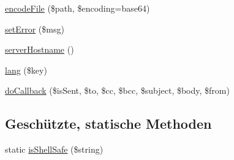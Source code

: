 \begin{DoxyCompactItemize}
\item 
\mbox{\hyperlink{class_p_h_p_mailer_a88d024bd390a552ebc9be66de1bf08d5}{encode\+File}} (\$path, \$encoding=\textquotesingle{}base64\textquotesingle{})
\item 
\mbox{\hyperlink{class_p_h_p_mailer_ac9a733d05c4cdbe4c98e731147303652}{set\+Error}} (\$msg)
\item 
\mbox{\hyperlink{class_p_h_p_mailer_a36f6955354169096bfe05a59565ae23c}{server\+Hostname}} ()
\item 
\mbox{\hyperlink{class_p_h_p_mailer_a60edd0800fd302bac9c30dbde7d705c5}{lang}} (\$key)
\item 
\mbox{\hyperlink{class_p_h_p_mailer_ac4ce55222eb113ec8a637fc4db518de7}{do\+Callback}} (\$is\+Sent, \$to, \$cc, \$bcc, \$subject, \$body, \$from)
\end{DoxyCompactItemize}
\subsection*{Geschützte, statische Methoden}
\begin{DoxyCompactItemize}
\item 
static \mbox{\hyperlink{class_p_h_p_mailer_a1456f83c2c70d379c7b66969db8a1519}{is\+Shell\+Safe}} (\$string)
\end{DoxyCompactItemize}
